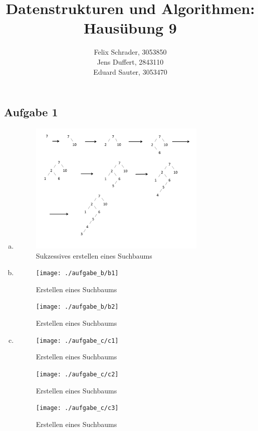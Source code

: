 \documentclass[11pt]{article}
\author{
  Felix Schrader, 3053850 \\ 
  Jens Duffert, 2843110 \\
  Eduard Sauter, 3053470
}
\title{Datenstrukturen und Algorithmen: Haus\"ubung 9}
\begin{document}
\maketitle
\subsection*{Aufgabe 1}
\begin{enumerate}[a)]
	\item
	\begin{figure}[h!]
	\centering	
	\includegraphics[width=0.8\textwidth]{aufgabe_a}
	\caption{Sukzessives erstellen eines Suchbaums}
	\end{figure}
	
	\item
	\begin{figure}[h!]
		\centering	
		\texttt{[image: ./aufgabe\_b/b1]}
		\caption{Erstellen eines Suchbaums}
	\end{figure}
	
		\begin{figure}[h!]
			\centering	
			\texttt{[image: ./aufgabe\_b/b2]}
			\caption{Erstellen eines Suchbaums}
		\end{figure}
		
		
		\item
		\begin{figure}[h!]
			\centering	
			\texttt{[image: ./aufgabe\_c/c1]}
			\caption{Erstellen eines Suchbaums}
		\end{figure}
		
		\begin{figure}[h!]
			\centering	
			\texttt{[image: ./aufgabe\_c/c2]}
			\caption{Erstellen eines Suchbaums}
		\end{figure}	
		
		\begin{figure}[h!]
			\centering	
			\texttt{[image: ./aufgabe\_c/c3]}
			\caption{Erstellen eines Suchbaums}
		\end{figure}	

\end{enumerate}
\end{document}
